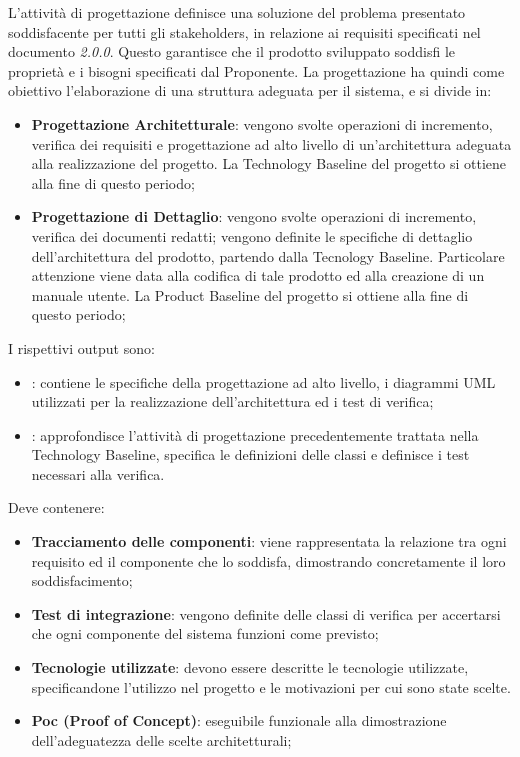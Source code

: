         L'attività di progettazione definisce una soluzione del problema presentato soddisfacente per tutti gli stakeholders, in relazione ai requisiti specificati nel documento \AdR{} \textit{2.0.0}. Questo garantisce che il prodotto sviluppato soddisfi le proprietà e i bisogni specificati dal Proponente.
        La progettazione ha quindi come obiettivo l'elaborazione di una struttura adeguata per il sistema, e si divide in:
        \begin{itemize}
        	\item{\textbf{Progettazione Architetturale}}: vengono svolte operazioni di incremento, verifica dei requisiti e progettazione ad alto livello di un'architettura adeguata alla realizzazione del progetto. La Technology Baseline del progetto si ottiene alla fine di questo periodo;
        	\item{\textbf{Progettazione di Dettaglio}}: vengono svolte operazioni di incremento, verifica dei documenti redatti; vengono definite le specifiche di dettaglio dell'architettura del prodotto, partendo dalla Tecnology Baseline. Particolare attenzione viene data alla codifica di tale prodotto ed alla creazione di un manuale utente. La Product Baseline del progetto si ottiene alla fine di questo periodo;
        \end{itemize}
    	I rispettivi output sono:
        \begin{itemize}
           	\item{\textbf{\TB{}}: contiene le specifiche della progettazione ad alto livello, i diagrammi UML utilizzati per la realizzazione dell'architettura ed i test di verifica;}
			\item{\textbf{\PB{}}: approfondisce l'attività di progettazione precedentemente trattata nella Technology Baseline, specifica le definizioni delle classi e definisce i test necessari alla verifica.}
   		\end{itemize}

  Deve contenere:
  \begin{itemize}
		\item \textbf{Tracciamento delle componenti}: viene rappresentata la relazione tra ogni requisito ed il componente che lo soddisfa, dimostrando concretamente il loro soddisfacimento;
		\item \textbf{Test di integrazione}: vengono definite delle classi di verifica per accertarsi che ogni componente del sistema funzioni come previsto;
		\item \textbf{Tecnologie utilizzate}: devono essere descritte le tecnologie utilizzate, specificandone l'utilizzo nel progetto e le motivazioni per cui sono state scelte.
		\item \textbf{Poc (Proof of Concept)}: eseguibile funzionale alla dimostrazione dell'adeguatezza delle scelte architetturali;
  \end{itemize}

